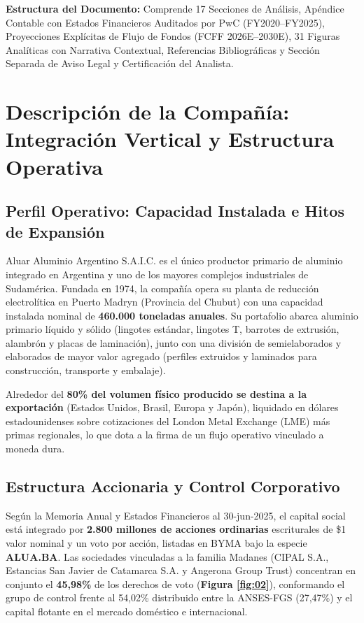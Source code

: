 \documentclass[10pt,a4paper]{article}
\begin{document}
\noindent
{\scriptsize \color{gsgray} \textbf{Estructura del Documento:} Comprende 17 Secciones de Análisis, Apéndice Contable con Estados Financieros Auditados por PwC (FY2020--FY2025), Proyecciones Explícitas de Flujo de Fondos (FCFF 2026E--2030E), 31 Figuras Analíticas con Narrativa Contextual, Referencias Bibliográficas y Sección Separada de Aviso Legal y Certificación del Analista.}

\clearpage

\section{Descripción de la Compañía: Integración Vertical y Estructura Operativa}

\subsection{Perfil Operativo: Capacidad Instalada e Hitos de Expansión}
Aluar Aluminio Argentino S.A.I.C. es el único productor primario de aluminio integrado en Argentina y uno de los mayores complejos industriales de Sudamérica. Fundada en 1974, la compañía opera su planta de reducción electrolítica en Puerto Madryn (Provincia del Chubut) con una capacidad instalada nominal de \textbf{460.000 toneladas anuales}. Su portafolio abarca aluminio primario líquido y sólido (lingotes estándar, lingotes T, barrotes de extrusión, alambrón y placas de laminación), junto con una división de semielaborados y elaborados de mayor valor agregado (perfiles extruidos y laminados para construcción, transporte y embalaje). 

Alrededor del \textbf{80\% del volumen físico producido se destina a la exportación} (Estados Unidos, Brasil, Europa y Japón), liquidado en dólares estadounidenses sobre cotizaciones del London Metal Exchange (LME) más primas regionales, lo que dota a la firma de un flujo operativo vinculado a moneda dura.

\subsection{Estructura Accionaria y Control Corporativo}
Según la Memoria Anual y Estados Financieros al 30-jun-2025, el capital social está integrado por \textbf{2.800 millones de acciones ordinarias} escriturales de \$1 valor nominal y un voto por acción, listadas en BYMA bajo la especie \textbf{ALUA.BA}. Las sociedades vinculadas a la familia Madanes (CIPAL S.A., Estancias San Javier de Catamarca S.A. y Angerona Group Trust) concentran en conjunto el \textbf{45,98\%} de los derechos de voto (\textbf{Figura \ref{fig:02}}), conformando el grupo de control frente al 54,02\% distribuido entre la ANSES-FGS (27,47\%) y el capital flotante en el mercado doméstico e internacional.
\end{document}
